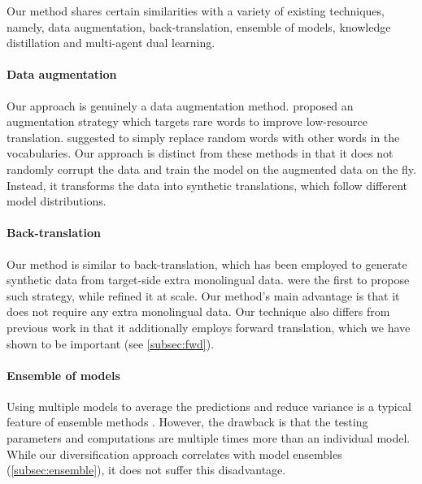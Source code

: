 \documentclass{article}
\begin{document}
Our method shares certain similarities with a variety of existing techniques, namely, data augmentation, back-translation, ensemble of models, knowledge distillation and multi-agent dual learning.

\vspace{-0.5em}
\paragraph{Data augmentation} Our approach is genuinely a data augmentation method. \citet{data_aug_low_resource_fadaee-etal-2017-data} proposed an augmentation strategy which targets rare words to improve low-resource translation. \citet{switchout} suggested to simply replace random words with other words in the vocabularies. 
Our approach is distinct from these methods in that it does not randomly corrupt the data and train the model on the augmented data on the fly. 
Instead, it transforms the data into synthetic translations, which follow different model distributions.



\vspace{-0.5em}
\paragraph{Back-translation} Our method is similar to back-translation, which has been employed to generate synthetic data from target-side extra monolingual data. \citet{backtranslate_sennrich-etal-2016-improving} were the first to propose such strategy, while \citet{understanding_backtranslation_scale} refined it at scale. Our method's main advantage is that it does not require any extra monolingual data. Our technique also differs from previous work in that it additionally employs forward translation, which we have shown to be important (see \cref{subsec:fwd}). 

\vspace{-0.5em}
\paragraph{Ensemble of models} Using multiple models to average the predictions and reduce variance is a typical feature of ensemble methods \citep{when_net_disaggree_perrone1992networks}. However, 
the drawback is that the testing parameters and computations are multiple times more than an individual model. {While our diversification approach correlates with model ensembles (\cref{subsec:ensemble})}, it does not suffer this disadvantage. 
\end{document}
